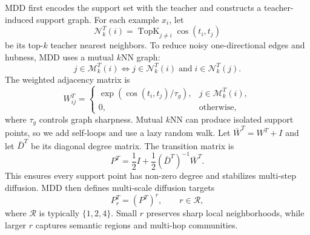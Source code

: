 MDD first encodes the support set with the teacher and constructs a teacher-induced support graph. For each example $x_i$, let
\begin{equation}
    \mathcal{N}_k^T(i)
    =
    \operatorname{TopK}_{j\neq i}\cos(t_i,t_j)
\end{equation}
be its top-$k$ teacher nearest neighbors. To reduce noisy one-directional edges and hubness, MDD uses a mutual $k$NN graph:
\begin{equation}
    j \in \mathcal{M}_k^T(i)
    \Longleftrightarrow
    j \in \mathcal{N}_k^T(i)
    \;\mathrm{and}\;
    i \in \mathcal{N}_k^T(j).
\end{equation}
The weighted adjacency matrix is
\begin{equation}
    W_{ij}^{T}
    =
    \begin{cases}
    \exp(\cos(t_i,t_j)/\tau_g), & j \in \mathcal{M}_k^T(i),\\
    0, & \mathrm{otherwise},
    \end{cases}
\end{equation}
where $\tau_g$ controls graph sharpness. Mutual $k$NN can produce isolated support points, so we add self-loops and use a lazy random walk. Let $\bar W^T=W^T+I$ and let $\bar D^T$ be its diagonal degree matrix. The transition matrix is
\begin{equation}
    P^T =
    \frac{1}{2}I
    +
    \frac{1}{2}(\bar D^T)^{-1}\bar W^T.
\end{equation}
This ensures every support point has non-zero degree and stabilizes multi-step diffusion. MDD then defines multi-scale diffusion targets
\begin{equation}
    P_r^T = (P^T)^r,
    \qquad r \in \mathcal{R},
\end{equation}
where $\mathcal{R}$ is typically $\{1,2,4\}$. Small $r$ preserves sharp local neighborhoods, while larger $r$ captures semantic regions and multi-hop communities.

